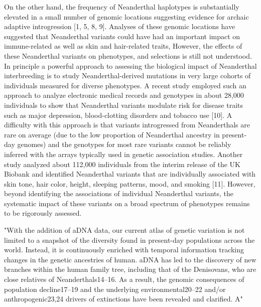 On the other hand, the frequency of Neanderthal haplotypes is substantially elevated in a small number of genomic locations suggesting evidence for archaic adaptive introgression [1, 5, 8, 9]. Analyses of these genomic locations have suggested that Neanderthal variants could have had an important impact on immune-related as well as skin and hair-related traits, However, the effects of these Neanderthal variants on phenotypes, and selections is still not understood.
In principle a powerful approach to assessing the biological impact of Neanderthal interbreeding is to study Neanderthal-derived mutations in very large cohorts of individuals measured for diverse phenotypes. A recent study employed such an approach to analyze electronic medical records and genotypes in about 28,000 individuals to show that Neanderthal variants modulate risk for disease traits such as major depression, blood-clotting disorders and tobacco use [10]. A difficulty with this approach is that variants introgressed from Neanderthals are rare on average (due to the low proportion of Neanderthal ancestry in present-day genomes) and the genotypes for most rare variants cannot be reliably inferred with the arrays typically used in genetic association studies. Another study analyzed about 112,000 individuals from the interim release of the UK Biobank and identified Neanderthal variants that are individually associated with skin tone, hair color, height, sleeping patterns, mood, and smoking [11]. However, beyond identifying the associations of individual Neanderthal variants, the systematic impact of these variants on a broad spectrum of phenotypes remains to be rigorously assessed. 





"With the addition
of aDNA data, our current atlas of genetic variation
is not limited to a snapshot of the diversity found in
present-day populations across the world. Instead, it is
continuously enriched with temporal information tracking changes in the genetic ancestries of human. aDNA has led to the discovery of new branches within
the human family tree, including that of the Denisovans,
who are close relatives of Neanderthals14–16. As a result,
the genomic consequences of population decline17–19
and the underlying environmental20–22 and/or anthropogenic23,24 drivers of extinctions have been revealed and
clarified. A"